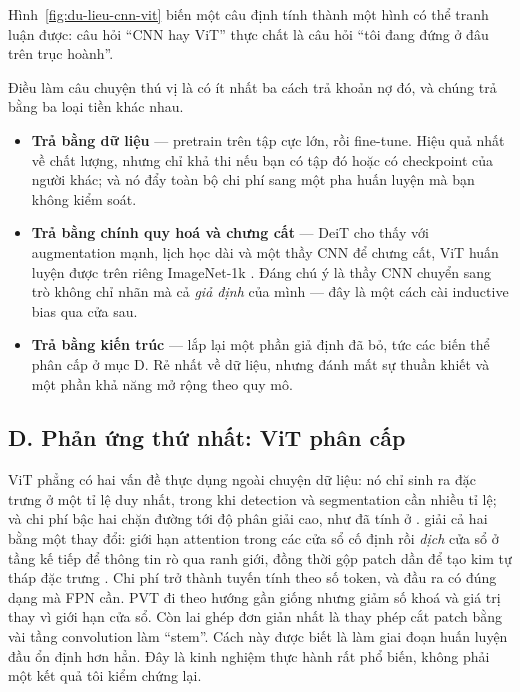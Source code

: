 \documentclass[../../../deep_learning.tex]{subfiles}
\begin{document}
Hình~\ref{fig:du-lieu-cnn-vit} biến một câu định tính thành một hình có thể tranh luận được: câu hỏi ``CNN hay ViT'' thực chất là câu hỏi ``tôi đang đứng ở đâu trên trục hoành''.

Điều làm câu chuyện thú vị là có ít nhất ba cách trả khoản nợ đó, và chúng trả bằng ba loại tiền khác nhau.

\begin{itemize}
\item \textbf{Trả bằng dữ liệu} --- pretrain trên tập cực lớn, rồi fine-tune. Hiệu quả nhất về chất lượng, nhưng chỉ khả thi nếu bạn có tập đó hoặc có checkpoint của người khác; và nó đẩy toàn bộ chi phí sang một pha huấn luyện mà bạn không kiểm soát.
\item \textbf{Trả bằng chính quy hoá và chưng cất} --- DeiT cho thấy với augmentation mạnh, lịch học dài và một thầy CNN để chưng cất, ViT huấn luyện được trên riêng ImageNet-1k \cite{touvron2021deit}. Đáng chú ý là thầy CNN chuyển sang trò không chỉ nhãn mà cả \emph{giả định} của mình --- đây là một cách cài inductive bias qua cửa sau.
\item \textbf{Trả bằng kiến trúc} --- lắp lại một phần giả định đã bỏ, tức các biến thể phân cấp ở mục D. Rẻ nhất về dữ liệu, nhưng đánh mất sự thuần khiết và một phần khả năng mở rộng theo quy mô.
\end{itemize}


\subsection{D. Phản ứng thứ nhất: ViT phân cấp}
ViT phẳng có hai vấn đề thực dụng ngoài chuyện dữ liệu: nó chỉ sinh ra đặc trưng ở một tỉ lệ duy nhất, trong khi detection và segmentation cần nhiều tỉ lệ; và chi phí bậc hai chặn đường tới độ phân giải cao, như đã tính ở .  giải cả hai bằng một thay đổi: giới hạn attention trong các cửa sổ cố định rồi \emph{dịch} cửa sổ ở tầng kế tiếp để thông tin rò qua ranh giới, đồng thời gộp patch dần để tạo kim tự tháp đặc trưng \cite{liu2021swin}. Chi phí trở thành tuyến tính theo số token, và đầu ra có đúng dạng mà FPN cần. PVT đi theo hướng gần giống nhưng giảm số khoá và giá trị thay vì giới hạn cửa sổ. Còn lai ghép đơn giản nhất là thay phép cắt patch bằng vài tầng convolution làm ``stem''. Cách này được biết là làm giai đoạn huấn luyện đầu ổn định hơn hẳn. Đây là kinh nghiệm thực hành rất phổ biến, không phải một kết quả tôi kiểm chứng lại.
\end{document}
